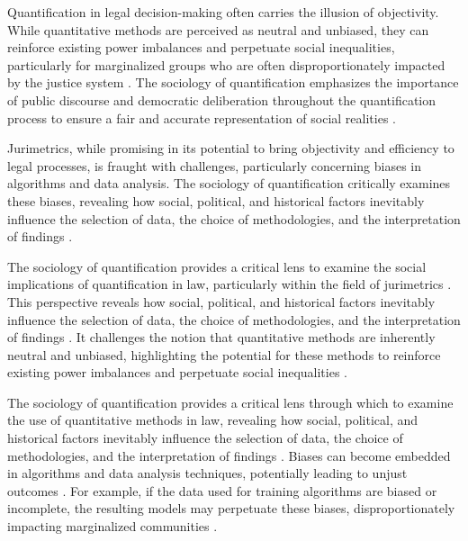 Quantification in legal decision-making often carries the illusion of objectivity. While quantitative methods are perceived as neutral and unbiased, they can reinforce existing power imbalances and perpetuate social inequalities, particularly for marginalized groups who are often disproportionately impacted by the justice system \cite{10.1590/data.2022.65.3.267,10.3390/fi9040068}. The sociology of quantification emphasizes the importance of public discourse and democratic deliberation throughout the quantification process to ensure a fair and accurate representation of social realities \cite{10.1590/data.2022.65.3.267,10.3390/fi9040068}.

Jurimetrics, while promising in its potential to bring objectivity and efficiency to legal processes, is fraught with challenges, particularly concerning biases in algorithms and data analysis. The sociology of quantification critically examines these biases, revealing how social, political, and historical factors inevitably influence the selection of data, the choice of methodologies, and the interpretation of findings \cite{10.1590/data.2022.65.3.267,10.3390/fi9040068}.

The sociology of quantification provides a critical lens to examine the social implications of quantification in law, particularly within the field of jurimetrics \cite{10.1057/s41599-020-00557-0,de2010jurimetrics}. This perspective reveals how social, political, and historical factors inevitably influence the selection of data, the choice of methodologies, and the interpretation of findings \cite{10.1057/s41599-020-00557-0,de2010jurimetrics}. It challenges the notion that quantitative methods are inherently neutral and unbiased, highlighting the potential for these methods to reinforce existing power imbalances and perpetuate social inequalities \cite{10.1057/s41599-020-00557-0,de2010jurimetrics}.

The sociology of quantification provides a critical lens through which to examine the use of quantitative methods in law, revealing how social, political, and historical factors inevitably influence the selection of data, the choice of methodologies, and the interpretation of findings \cite{10.5040/9781350220645,10.1080/07329113.2015.1046739}. Biases can become embedded in algorithms and data analysis techniques, potentially leading to unjust outcomes \cite{10.5040/9781350220645,10.1080/07329113.2015.1046739}. For example, if the data used for training algorithms are biased or incomplete, the resulting models may perpetuate these biases, disproportionately impacting marginalized communities \cite{10.5040/9781350220645,10.1080/07329113.2015.1046739}.

